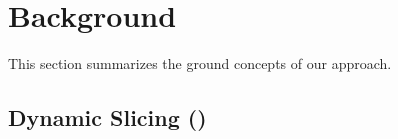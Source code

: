 \documentclass{article}
\begin{document}


\section{Background}
\label{sec:background}

This section summarizes the ground concepts of our approach.

\subsection{Dynamic Slicing (\ds{})}
\label{sec:slicing}
\end{document}

